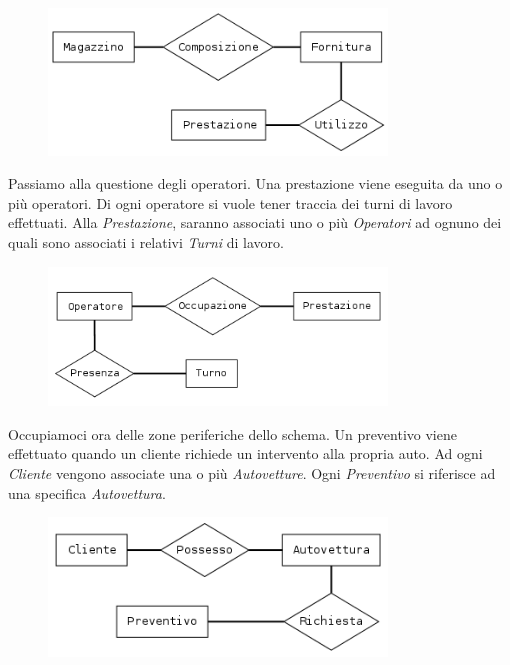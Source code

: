 		\begin{figure}[H]
			\centering
			\includegraphics[width=9cm]{images/diagrams/prestazione_fornitura.png}
		\end{figure}
		
		Passiamo alla questione degli operatori. Una prestazione viene eseguita da uno o più operatori. Di ogni operatore si vuole tener traccia dei turni di lavoro effettuati.
		Alla \emph{Prestazione}, saranno associati uno o più \emph{Operatori} ad ognuno dei quali sono associati i relativi \emph{Turni} di lavoro.
		
		\begin{figure}[H]
			\centering
			\includegraphics[width=9cm]{images/diagrams/operatore_turno_prestazione.png}
		\end{figure}
		
		Occupiamoci ora delle zone periferiche dello schema. Un preventivo viene effettuato quando un cliente richiede un intervento alla propria auto.
		Ad ogni \emph{Cliente} vengono associate una o più \emph{Autovetture}. Ogni \emph{Preventivo} si riferisce ad una specifica \emph{Autovettura}.
		
		\begin{figure}[H]
			\centering
			\includegraphics[width=9cm]{images/diagrams/cliente_autovettura_preventivo.png}
		\end{figure}
		
